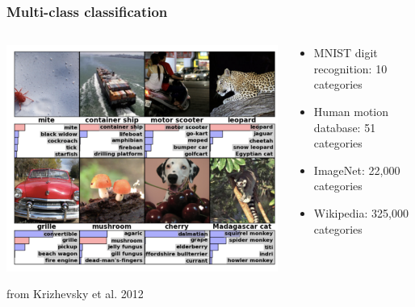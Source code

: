 \documentclass{beamer}
\begin{document}
\begin{frame}
\frametitle{Multi-class classification}
\begin{columns}
\begin{column}{0.5\textwidth}
\begin{center}
\includegraphics[scale = 0.4]{imagenet-fig4l.png}
\end{center}
\vspace{0.2in}
\tiny{from Krizhevsky et al. 2012}
\end{column}
\begin{column}{0.5\textwidth}
\begin{itemize}
\item MNIST digit recognition: 10 categories
\item Human motion database: 51 categories
\item ImageNet: 22,000 categories
\item Wikipedia: 325,000 categories
\end{itemize}
\end{column}
\end{columns}
\end{frame}
\end{document}
